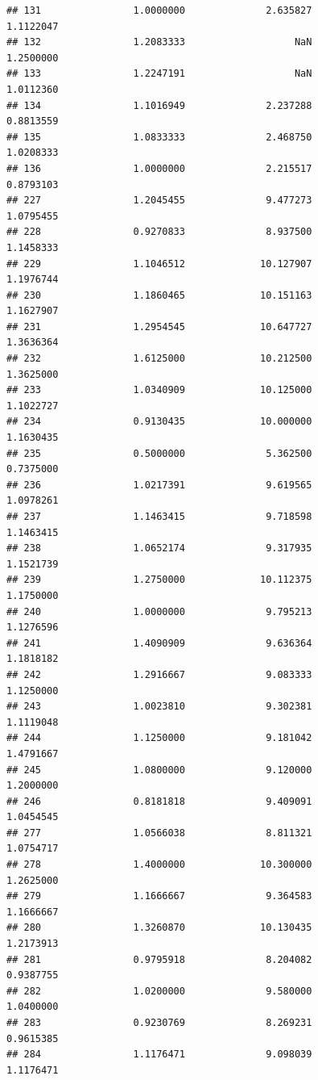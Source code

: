 \documentclass[]{article}
\begin{document}
\begin{verbatim}
## 131                1.0000000              2.635827               1.1122047
## 132                1.2083333                   NaN               1.2500000
## 133                1.2247191                   NaN               1.0112360
## 134                1.1016949              2.237288               0.8813559
## 135                1.0833333              2.468750               1.0208333
## 136                1.0000000              2.215517               0.8793103
## 227                1.2045455              9.477273               1.0795455
## 228                0.9270833              8.937500               1.1458333
## 229                1.1046512             10.127907               1.1976744
## 230                1.1860465             10.151163               1.1627907
## 231                1.2954545             10.647727               1.3636364
## 232                1.6125000             10.212500               1.3625000
## 233                1.0340909             10.125000               1.1022727
## 234                0.9130435             10.000000               1.1630435
## 235                0.5000000              5.362500               0.7375000
## 236                1.0217391              9.619565               1.0978261
## 237                1.1463415              9.718598               1.1463415
## 238                1.0652174              9.317935               1.1521739
## 239                1.2750000             10.112375               1.1750000
## 240                1.0000000              9.795213               1.1276596
## 241                1.4090909              9.636364               1.1818182
## 242                1.2916667              9.083333               1.1250000
## 243                1.0023810              9.302381               1.1119048
## 244                1.1250000              9.181042               1.4791667
## 245                1.0800000              9.120000               1.2000000
## 246                0.8181818              9.409091               1.0454545
## 277                1.0566038              8.811321               1.0754717
## 278                1.4000000             10.300000               1.2625000
## 279                1.1666667              9.364583               1.1666667
## 280                1.3260870             10.130435               1.2173913
## 281                0.9795918              8.204082               0.9387755
## 282                1.0200000              9.580000               1.0400000
## 283                0.9230769              8.269231               0.9615385
## 284                1.1176471              9.098039               1.1176471

\end{verbatim}
\end{document}
